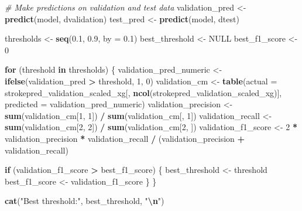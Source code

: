 \documentclass[
]{article}
\newenvironment{Shaded}{\begin{snugshade}}{\end{snugshade}}
\newcommand{\AttributeTok}[1]{\textcolor[rgb]{0.13,0.29,0.53}{#1}}
\newcommand{\CommentTok}[1]{\textcolor[rgb]{0.56,0.35,0.01}{\textit{#1}}}
\newcommand{\ConstantTok}[1]{\textcolor[rgb]{0.56,0.35,0.01}{#1}}
\newcommand{\ControlFlowTok}[1]{\textcolor[rgb]{0.13,0.29,0.53}{\textbf{#1}}}
\newcommand{\DecValTok}[1]{\textcolor[rgb]{0.00,0.00,0.81}{#1}}
\newcommand{\FloatTok}[1]{\textcolor[rgb]{0.00,0.00,0.81}{#1}}
\newcommand{\FunctionTok}[1]{\textcolor[rgb]{0.13,0.29,0.53}{\textbf{#1}}}
\newcommand{\NormalTok}[1]{#1}
\newcommand{\OtherTok}[1]{\textcolor[rgb]{0.56,0.35,0.01}{#1}}
\newcommand{\SpecialCharTok}[1]{\textcolor[rgb]{0.81,0.36,0.00}{\textbf{#1}}}
\newcommand{\StringTok}[1]{\textcolor[rgb]{0.31,0.60,0.02}{#1}}
\begin{document}
\begin{Shaded}
\begin{Highlighting}[]
\CommentTok{\# Make predictions on validation and test data}
\NormalTok{validation\_pred }\OtherTok{\textless{}{-}} \FunctionTok{predict}\NormalTok{(model, dvalidation)}
\NormalTok{test\_pred }\OtherTok{\textless{}{-}} \FunctionTok{predict}\NormalTok{(model, dtest)}
\end{Highlighting}
\end{Shaded}

\begin{Shaded}
\begin{Highlighting}[]
\NormalTok{thresholds }\OtherTok{\textless{}{-}} \FunctionTok{seq}\NormalTok{(}\FloatTok{0.1}\NormalTok{, }\FloatTok{0.9}\NormalTok{, }\AttributeTok{by =} \FloatTok{0.1}\NormalTok{)}
\NormalTok{best\_threshold }\OtherTok{\textless{}{-}} \ConstantTok{NULL}
\NormalTok{best\_f1\_score }\OtherTok{\textless{}{-}} \DecValTok{0}

\ControlFlowTok{for}\NormalTok{ (threshold }\ControlFlowTok{in}\NormalTok{ thresholds) \{}
\NormalTok{  validation\_pred\_numeric }\OtherTok{\textless{}{-}} \FunctionTok{ifelse}\NormalTok{(validation\_pred }\SpecialCharTok{\textgreater{}}\NormalTok{ threshold, }\DecValTok{1}\NormalTok{, }\DecValTok{0}\NormalTok{)}
\NormalTok{  validation\_cm }\OtherTok{\textless{}{-}} \FunctionTok{table}\NormalTok{(}\AttributeTok{actual =}\NormalTok{ strokepred\_validation\_scaled\_xg[, }\FunctionTok{ncol}\NormalTok{(strokepred\_validation\_scaled\_xg)], }\AttributeTok{predicted =}\NormalTok{ validation\_pred\_numeric)}
\NormalTok{  validation\_precision }\OtherTok{\textless{}{-}} \FunctionTok{sum}\NormalTok{(validation\_cm[}\DecValTok{1}\NormalTok{, }\DecValTok{1}\NormalTok{]) }\SpecialCharTok{/} \FunctionTok{sum}\NormalTok{(validation\_cm[, }\DecValTok{1}\NormalTok{])}
\NormalTok{  validation\_recall }\OtherTok{\textless{}{-}} \FunctionTok{sum}\NormalTok{(validation\_cm[}\DecValTok{2}\NormalTok{, }\DecValTok{2}\NormalTok{]) }\SpecialCharTok{/} \FunctionTok{sum}\NormalTok{(validation\_cm[}\DecValTok{2}\NormalTok{, ])}
\NormalTok{  validation\_f1\_score }\OtherTok{\textless{}{-}} \DecValTok{2} \SpecialCharTok{*}\NormalTok{ validation\_precision }\SpecialCharTok{*}\NormalTok{ validation\_recall }\SpecialCharTok{/}\NormalTok{ (validation\_precision }\SpecialCharTok{+}\NormalTok{ validation\_recall)}

  \ControlFlowTok{if}\NormalTok{ (validation\_f1\_score }\SpecialCharTok{\textgreater{}}\NormalTok{ best\_f1\_score) \{}
\NormalTok{    best\_threshold }\OtherTok{\textless{}{-}}\NormalTok{ threshold}
\NormalTok{    best\_f1\_score }\OtherTok{\textless{}{-}}\NormalTok{ validation\_f1\_score}
\NormalTok{  \}}
\NormalTok{\}}

\FunctionTok{cat}\NormalTok{(}\StringTok{"Best threshold:"}\NormalTok{, best\_threshold, }\StringTok{"}\SpecialCharTok{\textbackslash{}n}\StringTok{"}\NormalTok{)}
\end{Highlighting}
\end{Shaded}
\end{document}
